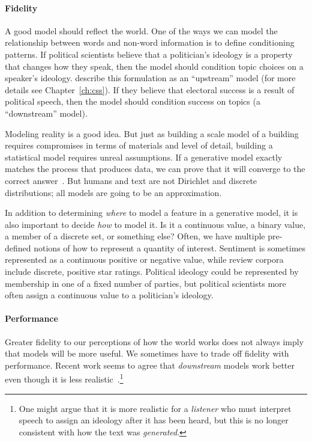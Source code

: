 \paragraph{Fidelity}

A good model should reflect the world. One of the ways we can model the relationship between words and non-word information is to define conditioning patterns.
If political scientists believe that a politician's ideology is a property that changes how they speak, then the model should condition topic choices on a speaker's ideology.
\citet{mimno-08} describe this formulation as an ``upstream'' model (for more details see Chapter~\ref{ch:css}).
If they believe that electoral success is a result of political speech, then the model should condition success on topics (a ``downstream'' model).

Modeling reality is a good idea. But just as building a scale model of a building requires compromises in terms of materials and level of detail, building a statistical model requires unreal assumptions.
If a generative model exactly
matches the process that produces data, we can prove that it will
converge to the correct answer~\citep{neal-93}.
But humans and text are
not Dirichlet and discrete distributions; all models are going to
be an approximation.

In addition to determining \emph{where} to model a feature in a
generative model, it is also important to decide \emph{how} to model
it.  Is it a continuous value, a binary value, a member of a discrete
set, or something else?  Often, we have multiple pre-defined notions of how to
represent a quantity of interest.
Sentiment is sometimes represented as a continuous positive or negative value, while review corpora include discrete, positive star ratings.
Political ideology could be represented by membership in one of a fixed number of
parties, but political scientists more often assign a continuous value to a
politician's ideology.

\paragraph{Performance}

Greater fidelity to our perceptions of how the world works does not always imply that models will be more  useful.
We sometimes have to trade off fidelity with performance.
Recent work seems to agree that \emph{downstream} models work better even though it is
less realistic~\citep{nguyen-13:shlda}.\footnote{One might argue that it is more realistic for
  a \emph{listener} who must interpret speech to assign an ideology
  after it has been heard, but this is no longer consistent with how
  the text was \emph{generated}.} 

